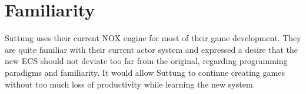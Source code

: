 \section{Familiarity}
Suttung uses their current NOX engine for most of their game development.
They are quite familiar with their current actor system and expressed a desire that the new
ECS should not deviate too far from the original, regarding programming paradigms and familiarity.
It would allow Suttung to continue creating games without too much loss of productivity while learning the new system.


